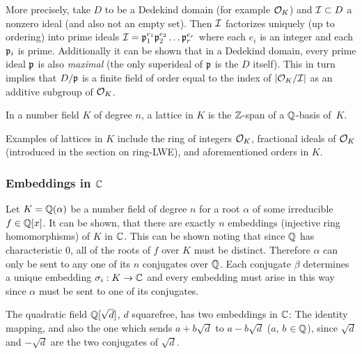 More precisely, take $D$ to be a Dedekind  domain (for example $\mathcal{O}_K$) and $\mathcal{I} \subset D$ a nonzero ideal (and also not an empty set). Then $\mathcal{I}$ factorizes uniquely (up to ordering) into prime ideals $\mathcal{I} = \mathfrak{p}_1^{e_1} \mathfrak{p}_2^{e_2} \ldots \mathfrak{p}_r^{e_r}$ where each $e_i$ is an integer and each $\mathfrak{p}_i$ is prime. Additionally it can be shown that in a Dedekind domain, every prime ideal $\mathfrak{p}$ is also \textit{maximal} (the only superideal  of $\mathfrak{p}$ is the $D$ itself). This in turn implies that $D/\mathfrak{p}$ is a finite field of order equal to the index of $|\mathcal{O}_K /\mathcal{I}|$ as an additive subgroup of $\mathcal{O}_K$. 

\begin{definition}
	In a number field $K$ of degree $n$, a lattice in $K$ is the $\mathbb{Z}$-span of a $\mathbb{Q}$-basis of~$K$.
\end{definition}
Examples of lattices in $K$ include the ring of integers $\mathcal{O}_K$, fractional ideals of $\mathcal{O}_K$ (introduced in the section on ring-LWE), and aforementioned orders in $K$.


\subsubsection*{Embeddings in $\mathbb{C}$} 
Let $K = \mathbb{Q}(\alpha)$ be a number field of degree $n$ for a root $\alpha$ of some irreducible $f \in \mathbb{Q}[x]$. It can be shown, that there are exactly $n$ embeddings (injective ring homomorphisms) of $K$ in $\mathbb{C}$. This can be shown noting that since $\mathbb{Q}$ has characteristic 0, all of the roots of $f$ over $K$ must be distinct. Therefore $\alpha$ can only be sent to any one of its $n$ conjugates over $\mathbb{Q}$. Each conjugate $\beta$ determines a unique embedding $\sigma_i: K \rightarrow \mathbb{C}$ and every embedding must arise in this way since $\alpha$ must be sent to one of its conjugates.

\begin{example}
    The quadratic field $\mathbb{Q}[\sqrt{d}]$, $d$ squarefree, has two embeddings in $\mathbb{C}$: The identity mapping, and also the one which sends $a + b\sqrt{d}$ to $a - b\sqrt{d}$ ($a$, $b$ $\in \mathbb{Q}$), since $\sqrt{d}$ and $-\sqrt{d}$ are the two conjugates of $\sqrt{d}$.
\end{example}
 

